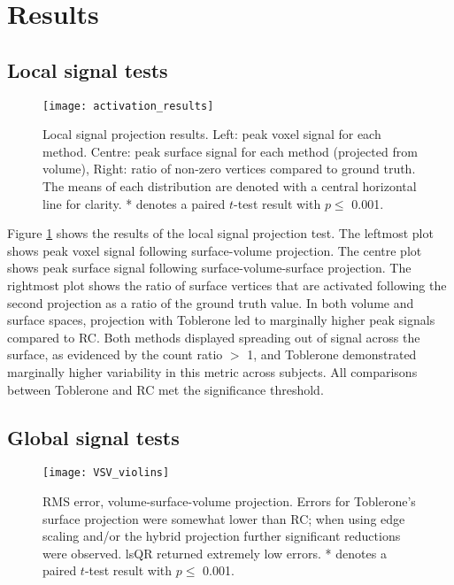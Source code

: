 \section{Results}

\subsection{Local signal tests}

\begin{figure}[H]
\centering
\texttt{[image: activation\_results]}
\caption{Local signal projection results. Left: peak voxel signal for each method. Centre: peak surface signal for each method (projected from volume), Right: ratio of non-zero vertices compared to ground truth. The means of each distribution are denoted with a central horizontal line for clarity. * denotes a paired $t$-test result with $p\leq $ 0.001.}
\label{local_results} 
\end{figure}

Figure \ref{local_results} shows the results of the local signal projection test. The leftmost plot shows peak voxel signal following surface-volume projection. The centre plot shows peak surface signal following surface-volume-surface projection. The rightmost plot shows the ratio of surface vertices that are activated following the second projection as a ratio of the ground truth value. In both volume and surface spaces, projection with Toblerone led to marginally higher peak signals compared to RC. Both methods displayed spreading out of signal across the surface, as evidenced by the count ratio $>$ 1, and Toblerone demonstrated marginally higher variability in this metric across subjects. All comparisons between Toblerone and RC met the significance threshold. 

\subsection{Global signal tests}

\begin{figure}[H]
\centering
\texttt{[image: VSV\_violins]}
\caption{RMS error, volume-surface-volume projection. Errors for Toblerone's surface projection were somewhat lower than RC; when using edge scaling and/or the hybrid projection further significant reductions were observed. lsQR returned extremely low errors. * denotes a paired $t$-test result with $p\leq $ 0.001.}
\label{VSV_rms} 
\end{figure}


